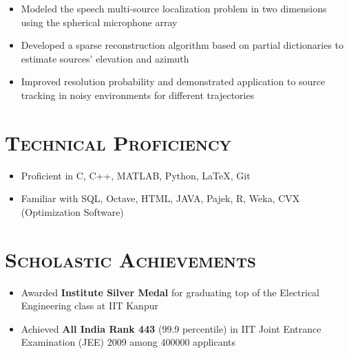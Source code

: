 \documentclass [letterpaper,10pt]{article}
\newcommand{\NewPart}[1]{\section*{\large\textsc{#1}}}
\begin{document}
\vspace{-16pt}
\begin{itemize} \itemsep -2.5pt
	\item Modeled the speech multi-source localization problem in two dimensions using the spherical microphone array
	\item Developed a sparse reconstruction algorithm based on partial dictionaries to estimate sources' elevation and azimuth
	\item Improved resolution probability and demonstrated application to source tracking in noisy environments for different trajectories
\end{itemize}
\vspace{-15pt}
\NewPart{Technical Proficiency}{}
\begin{itemize}\itemsep -2.5pt
	\item Proficient in C, C++, MATLAB, Python, \LaTeX, Git
	\item Familiar with SQL, Octave, HTML, JAVA, Pajek, R, Weka, CVX (Optimization Software)
\end{itemize}
\vspace{-15pt}
\NewPart{Scholastic Achievements}{}
\vspace{-3pt}
\begin{itemize}\itemsep -2.5pt
	\item Awarded {\textbf{Institute Silver Medal}} for graduating top of the Electrical Engineering class at IIT Kanpur
	\item Achieved \textbf{All India Rank 443} (99.9 percentile) in IIT Joint Entrance Examination (JEE) 2009 among 400000 applicants
\end{itemize}
\end{document}
